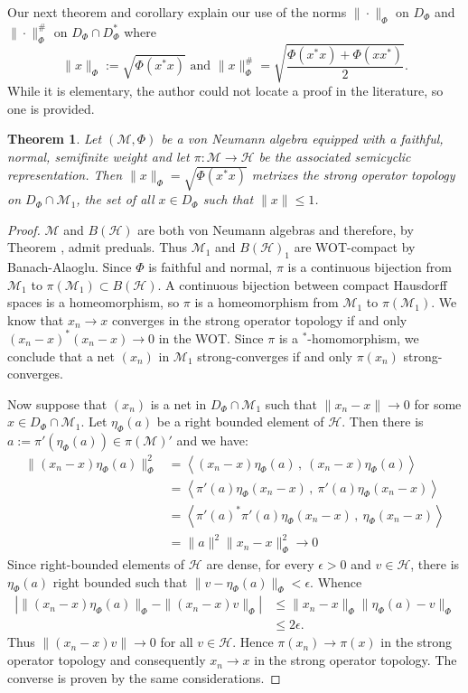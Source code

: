\documentclass[12pt]{amsart}
\newtheorem{thm}{Theorem}[section]
\theoremstyle{definition}
\def\cal{\mathcal}
\newcommand\ip[2]{\left\langle #1\, ,\!\ #2 \right\rangle}
\begin{document}
Our next theorem and corollary explain our use of the norms $\|\cdot\|_{\Phi}$ on $D_{\Phi}$ and $\|\cdot\|_{\Phi}^\#$ on $D_{\Phi} \cap D_{\Phi}^*$ where
\[
\|x\|_{\Phi} := \sqrt{\Phi(x^*x)}  \text{ and } \|x\|_{\Phi}^\# = \sqrt{\frac{\Phi(x^*x) + \Phi(xx^*)}{2}}.
\]
While it is elementary, the author could not locate a proof in the literature, so one is provided.

\begin{thm}\label{TheoremPhiMetrize}
    Let $(\cal M, \Phi)$ be a von Neumann algebra equipped with a faithful, normal, semifinite weight and let $\pi: \cal M \to \cal H$ be the associated semicyclic representation.  Then $\|x\|_\Phi = \sqrt{\Phi(x^*x)}$ metrizes the strong operator topology on $D_\Phi \cap \cal M_1$, the set of all $x \in D_\Phi$ such that $\|x\| \leq 1$.
\end{thm}

\begin{proof}
    $\cal M$ and $B(\cal H)$ are both von Neumann algebras and therefore, by Theorem , admit preduals.  Thus $\cal M_1$ and $B(\cal H)_1$ are WOT-compact by Banach-Alaoglu.  Since $\Phi$ is faithful and normal, $\pi$ is a continuous bijection from $\cal M_1$ to $\pi(\cal M_1) \subset B(\cal H)$.  A continuous bijection between compact Hausdorff spaces is a homeomorphism, so $\pi$ is a homeomorphism from $\cal M_1$ to $\pi(\cal M_1)$.  We know that $x_n \to x$ converges in the strong operator topology if and only $(x_n - x)^*(x_n - x) \to 0$ in the WOT.  Since $\pi$ is a $^*$-homomorphism, we conclude that a net $(x_n)$ in $\cal M_1$ strong-converges if and only $\pi(x_n)$ strong-converges.
    
    Now suppose that $(x_n)$ is a net in $D_\Phi \cap \cal M_1$ such that $\|x_n - x\| \to 0$ for some $x \in D_\Phi \cap \cal M_1$.  Let $\eta_\Phi(a)$ be a right bounded element of $\cal H$.  Then there is $a := \pi'(\eta_\Phi(a)) \in \pi(\cal M)'$ and we have:
    \begin{align}
        \|(x_n - x)\eta_\Phi(a)\|_\Phi^2 &= \ip{(x_n - x)\eta_\Phi(a)}{(x_n - x)\eta_\Phi(a)} \nonumber \\
        &= \ip{\pi'(a)\eta_\Phi(x_n - x)}{\pi'(a)\eta_\Phi(x_n - x)} \nonumber \\
        &= \ip{\pi'(a)^*\pi'(a)\eta_\Phi(x_n - x)}{\eta_\Phi(x_n - x)} \nonumber \\
        &= \|a\|^2\|x_n - x\|_\Phi^2 \to 0 \nonumber
    \end{align}
    Since right-bounded elements of $\cal H$ are dense, for every $\epsilon > 0$ and $v \in \cal H$, there is $\eta_\Phi(a)$ right bounded such that $\|v - \eta_\Phi(a)\|_\Phi < \epsilon$.  Whence
    \begin{align}
        |\|(x_n-x)\eta_\Phi(a)\|_\Phi - \|(x_n-x)v\|_\Phi| &\leq \|x_n - x\|_\Phi\|\eta_\Phi(a) - v\|_\Phi  \nonumber \\
        &\leq 2\epsilon.  \nonumber 
    \end{align}
    Thus $\|(x_n - x)v\| \to 0$ for all $v \in \cal H$.  Hence $\pi(x_n) \to \pi(x)$ in the strong operator topology and consequently $x_n \to x$ in the strong operator topology.  The converse is proven by the same considerations.
\end{proof}
\end{document}
